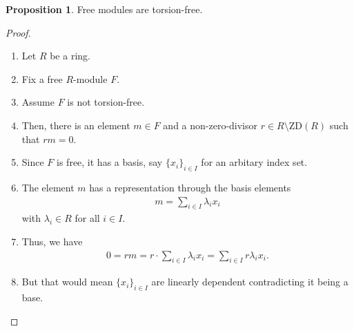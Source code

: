 \documentclass[a4paper]{book}
\theoremstyle{definition}
\newtheorem{proposition}[definition]{Proposition}
\begin{document}
\begin{proposition}
    Free modules are torsion-free.
\end{proposition}
\begin{proof}
    \begin{enumerate}
        \item Let \(R\) be a ring.
        \item Fix a free \(R\)-module \(F\).
        \item Assume \(F\) is not torsion-free.
        \item Then, there is an element \(m \in F\) and a non-zero-divisor \(r \in R \setminus \text{ZD}(R)\) such that \(rm = 0\).
        \item Since \(F\) is free, it has a basis, say \(\{x_i\}_{i \in I}\) for an arbitary index set.
        \item The element \(m\) has a representation through the basis elements \begin{align*}
            m = \sum_{i \in I} \lambda_i x_i
        \end{align*}
        with \(\lambda_i \in R\) for all \(i \in I\).
        \item Thus, we have \begin{align*}
            0 = rm = r \cdot \sum_{i \in I} \lambda_i x_i = \sum_{i \in I} r \lambda_i x_i \text{.}
        \end{align*}
        \item But that would mean \(\{x_i\}_{i \in I}\) are linearly dependent contradicting it being a base.
    \end{enumerate}
\end{proof}
\end{document}
